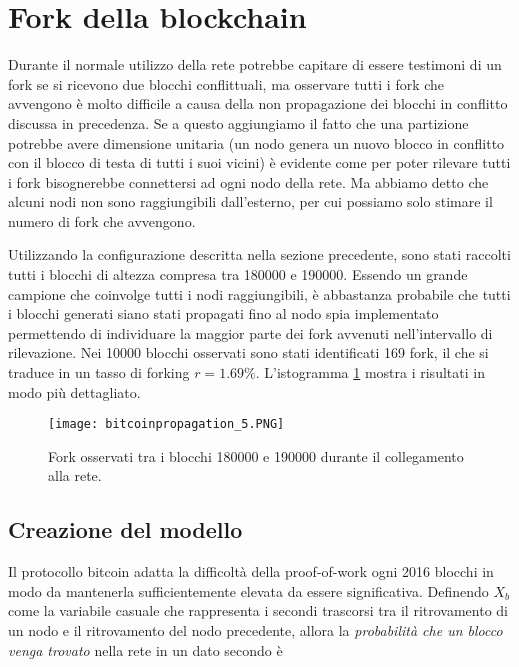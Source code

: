 \section{Fork della blockchain}\label{fork-della-blockchain}

Durante il normale utilizzo della rete potrebbe capitare di essere testimoni di un fork se si ricevono due blocchi conflittuali, ma osservare tutti i fork che avvengono è molto difficile a causa della non propagazione dei blocchi in conflitto discussa in precedenza. Se a questo aggiungiamo il fatto che una partizione potrebbe avere dimensione unitaria (un nodo genera un nuovo blocco in conflitto con il blocco di testa di tutti i suoi vicini) è evidente come per poter rilevare tutti i fork bisognerebbe connettersi ad ogni nodo della rete. Ma abbiamo detto che alcuni nodi non sono raggiungibili dall'esterno, per cui possiamo solo stimare il numero di fork che avvengono.

Utilizzando la configurazione descritta nella sezione precedente, sono stati raccolti tutti i blocchi di altezza compresa tra 180000 e 190000. Essendo un grande campione che coinvolge tutti i nodi raggiungibili, è abbastanza probabile che tutti i blocchi generati siano stati propagati fino al nodo spia implementato permettendo di individuare la maggior parte dei fork avvenuti nell'intervallo di rilevazione. Nei 10000 blocchi osservati sono stati identificati 169 fork, il che si traduce in un tasso di forking $r = 1.69\%$. L'istogramma \ref{bitcoinpropagation_5} mostra i risultati in modo più dettagliato.

\begin{figure}[htbp]
\centering
\texttt{[image: bitcoinpropagation\_5.PNG]}
\caption[Fork nella Blockchain]{Fork osservati tra i blocchi 180000 e 190000 durante il collegamento alla rete.\label{bitcoinpropagation_5}}
\end{figure}

\subsection{Creazione del modello}\label{creazione-del-modello}

Il protocollo bitcoin adatta la difficoltà della proof-of-work ogni 2016 blocchi in modo da mantenerla sufficientemente elevata da essere significativa. Definendo $X_b$ come la variabile casuale che rappresenta i secondi trascorsi tra il ritrovamento di un nodo e il ritrovamento del nodo precedente, allora la \emph{probabilità che un blocco venga trovato} nella rete in un dato secondo è

